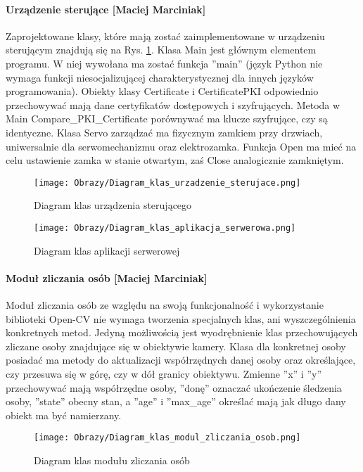 	\paragraph*{Urządzenie sterujące [Maciej Marciniak]}
	Zaprojektowane klasy, które mają zostać zaimplementowane w urządzeniu sterującym znajdują się na Rys. \ref{diagram:Diagram_klas_urzadzenia_sterujacego}. Klasa Main jest głównym elementem programu. W niej wywołana ma zostać funkcja ''main'' (język Python nie wymaga funkcji niesocjalizującej charakterystycznej dla innych języków programowania). Obiekty klasy Certificate i CertificatePKI odpowiednio przechowywać mają dane certyfikatów dostępowych i szyfrujących. Metoda w Main Compare\_PKI\_Certificate porównywać ma klucze szyfrujące, czy są identyczne. Klasa Servo zarządzać ma fizycznym zamkiem przy drzwiach, uniwersalnie dla serwomechanizmu oraz elektrozamka. Funkcja Open ma mieć na celu ustawienie zamka w stanie otwartym, zaś Close analogicznie zamkniętym. 
	
	\begin{figure}[!h]
		\centering
		\texttt{[image: Obrazy/Diagram\_klas\_urzadzenie\_sterujace.png]}
		\caption{Diagram klas urządzenia sterującego}
		\label{diagram:Diagram_klas_urzadzenia_sterujacego}
	\end{figure}

		\begin{landscape}
		\begin{figure}[!h]
			\centering
			\vspace{2.5cm}
			\texttt{[image: Obrazy/Diagram\_klas\_aplikacja\_serwerowa.png]}
			\caption{Diagram klas aplikacji serwerowej}
			\label{diagram:Diagram_klas_aplikacji_serwerowej}
		\end{figure}	
	\end{landscape}
			
	\paragraph*{Moduł zliczania osób [Maciej Marciniak]}
	Moduł zliczania osób ze względu na swoją funkcjonalność i wykorzystanie biblioteki Open-CV nie wymaga tworzenia specjalnych klas, ani wyszczególnienia konkretnych metod. Jedyną możliwością jest wyodrębnienie klas przechowujących zliczane osoby znajdujące się w obiektywie kamery. Klasa dla konkretnej osoby posiadać ma metody do aktualizacji współrzędnych danej osoby oraz określające, czy przesuwa się w górę, czy w dół granicy obiektywu. Zmienne ''x'' i ''y'' przechowywać mają współrzędne osoby, ''donę'' oznaczać ukończenie śledzenia osoby, ''state'' obecny stan, a ''age'' i ''max\_age'' określać mają jak długo dany obiekt ma być namierzany.
	\begin{figure}[!h]
		\centering
		\texttt{[image: Obrazy/Diagram\_klas\_modul\_zliczania\_osob.png]}
		\caption{Diagram klas modułu zliczania osób}
		\label{diagram:Diagram_klas_modul_zliczania_osob}
	\end{figure}
		
